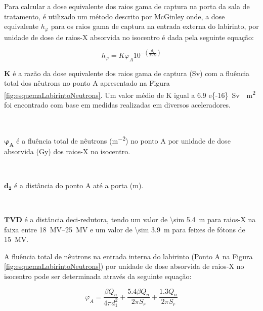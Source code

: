 \documentclass[11pt,a4paper]{article}
\newcounter{exemplo}
\begin{document}
        Para calcular a dose equivalente dos raios gama de captura na porta da sala de tratamento, é utilizado um método descrito por McGinley onde, a dose equivalente $h_{\varphi}$ para os raios gama de captura na entrada externa do labirinto, por unidade de dose de raios-X absorvida no isocentro é dada pela seguinte equação:

            \begin{equation}
                h_{\varphi} = K \varphi_A 10^{-\left(\frac{d_2}{TVD}\right)}
            \end{equation}


        \begin{exemplo}[onde:]
                \textcolor{CarnationPink}{$\mathbf{K}$} é a razão da dose equivalente dos raios gama de captura (Sv) com a fluência total dos nêutrons no ponto A apresentado na Figura \ref{fig:esquemaLabirintoNeutrons}. Um valor médio de K igual a \qty{6.9 e{-16}}{Sv \cdot m^2} foi encontrado com base em medidas realizadas em diversos aceleradores.

                \

                \textcolor{CarnationPink}{$\mathbf{\varphi_A}$} é a fluência total de nêutrons (\unit{m^{-2}}) no ponto A por unidade de dose absorvida (\unit{Gy}) dos raios-X no isocentro.

                \

                \textcolor{CarnationPink}{$\mathbf{d_2}$} é a distância do ponto A até a porta (m).

                \

                \textcolor{CarnationPink}{$\mathbf{TVD}$} é a distância deci-redutora, tendo um valor de \qty{\sim 5.4}{m} para raios-X na faixa entre \qtyrange{18}{25}{MV} e um valor de \qty{\sim 3.9}{m} para feixes de fótons de \qty{15}{MV}.
        \end{exemplo}

        A fluência total de nêutrons na entrada interna do labirinto (Ponto A na Figura \ref{fig:esquemaLabirintoNeutrons}) por unidade de dose absorvida de raios-X no isocentro pode ser determinada através da seguinte equação:

            \begin{equation}
                \varphi_A = \frac{\beta Q_n}{4 \pi d_1^2} 
                + \frac{5.4 \beta Q_n}{2 \pi S_r} 
                + \frac{1.3 Q_n}{2 \pi S_r}
            \end{equation}
\end{document}

